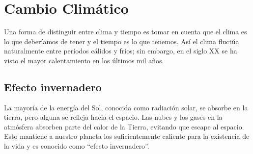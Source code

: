  \section{Cambio Climático}
 
Una forma de distinguir entre clima y tiempo es tomar en cuenta que el clima es lo que deberíamos de tener y el tiempo es lo que tenemos. Así el clima fluctúa naturalmente entre períodos cálidos y fríos; sin embargo, en el siglo XX se ha visto el mayor calentamiento en los últimos mil años.
\subsection{Efecto invernadero}
La mayoría de la energía del Sol, conocida como radiación solar, se absorbe en la tierra, pero alguna se refleja hacia el espacio. Las nubes y los gases en la atmósfera absorben parte del calor de la Tierra, evitando que escape al espacio. Esto mantiene a nuestro planeta los suficientemente caliente para la existencia de la vida y es conocido como ``efecto invernadero''.


